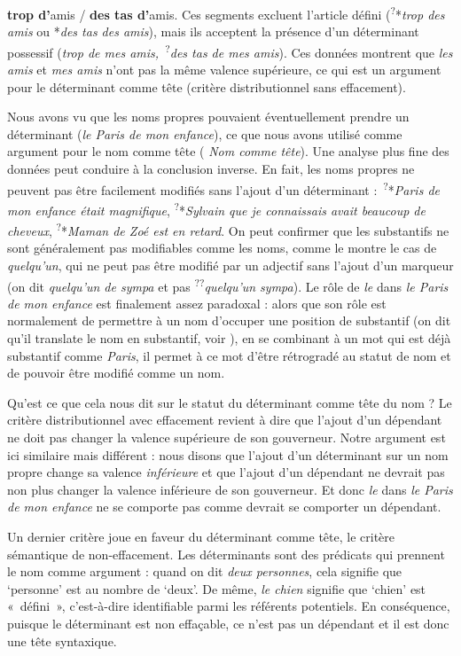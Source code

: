 \textbf{{trop d’}}{amis} / \textbf{{des tas d’}}{amis.}\z
Ces segments excluent l’article défini (\textsuperscript{?}*\textit{trop des amis} ou *\textit{des tas des amis}), mais ils acceptent la présence d’un déterminant possessif (\textit{trop de mes amis,~}\textsuperscript{?}\textit{des tas de mes amis}). Ces données montrent que \textit{les amis} et \textit{mes amis} n’ont pas la même valence supérieure, ce qui est un argument pour le déterminant comme tête (critère distributionnel sans effacement).

Nous avons vu que les noms propres pouvaient éventuellement prendre un déterminant (\textit{le Paris de mon enfance}), ce que nous avons utilisé comme argument pour le nom comme tête ( \textit{Nom comme tête}). Une analyse plus fine des données peut conduire à la conclusion inverse. En fait, les noms propres ne peuvent pas être facilement modifiés sans l’ajout d’un déterminant :~\textsuperscript{?}*\textit{Paris de mon enfance était magnifique}, \textsuperscript{?}*\textit{Sylvain que je connaissais avait beaucoup de cheveux}, \textsuperscript{?}*\textit{Maman de Zoé est en retard}. On peut confirmer que les substantifs ne sont généralement pas modifiables comme les noms, comme le montre le cas de \textit{quelqu’un}, qui ne peut pas être modifié par un adjectif sans l’ajout d’un marqueur (on dit \textit{quelqu’un de sympa} et pas \textsuperscript{??}\textit{quelqu’un sympa}). Le rôle de \textit{le} dans \textit{le Paris de mon enfance} est finalement assez paradoxal : alors que son rôle est normalement de permettre à un nom d’occuper une position de substantif (on dit qu’il translate le nom en substantif, voir ), en se combinant à un mot qui est déjà substantif comme \textit{Paris}, il permet à ce mot d’être rétrogradé au statut de nom et de pouvoir être modifié comme un nom.

Qu’est ce que cela nous dit sur le statut du déterminant comme tête du nom ? Le critère distributionnel avec effacement revient à dire que l’ajout d’un dépendant ne doit pas changer la valence supérieure de son gouverneur. Notre argument est ici similaire mais différent : nous disons que l’ajout d’un déterminant sur un nom propre change sa valence \textit{inférieure} et que l’ajout d’un dépendant ne devrait pas non plus changer la valence inférieure de son gouverneur. Et donc \textit{le} dans \textit{le Paris de mon enfance} ne se comporte pas comme devrait se comporter un dépendant.

Un dernier critère joue en faveur du déterminant comme tête, le critère sémantique de non-effacement. Les déterminants sont des prédicats qui prennent le nom comme argument : quand on dit \textit{deux personnes}, cela signifie que ‘personne’ est au nombre de ‘deux’. De même, \textit{le chien} signifie que ‘chien’ est «~défini~», c’est-à-dire identifiable parmi les référents potentiels. En conséquence, puisque le déterminant est non effaçable, ce n’est pas un dépendant et il est donc une tête syntaxique.

